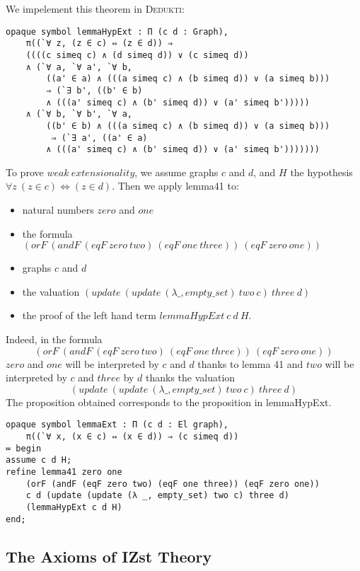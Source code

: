 \documentclass[submission,copyright,creativecommons]{eptcs}
\def\fa{{\forall}}
\newcommand{\dedukti}{\textsc{Dedukti}}
\begin{document}
We impelement this theorem in \dedukti:

\begin{lstlisting}
opaque symbol lemmaHypExt : Π (c d : Graph), 
	π((`∀ z, (z ∈ c) ⇔ (z ∈ d)) ⇒ 
	((((c simeq c) ∧ (d simeq d)) ∨ (c simeq d))
	∧ (`∀ a, `∀ a', `∀ b, 
		((a' ∈ a) ∧ (((a simeq c) ∧ (b simeq d)) ∨ (a simeq b))) 
		⇒ (`∃ b', ((b' ∈ b) 
		∧ (((a' simeq c) ∧ (b' simeq d)) ∨ (a' simeq b')))))
	∧ (`∀ b, `∀ b', `∀ a, 
		((b' ∈ b) ∧ (((a simeq c) ∧ (b simeq d)) ∨ (a simeq b)))
		 ⇒ (`∃ a', ((a' ∈ a) 
	 	∧ (((a' simeq c) ∧ (b' simeq d)) ∨ (a' simeq b')))))))
\end{lstlisting}

To prove $weak \ extensionality$, we assume graphs $c$ and $d$, and $H$ the hypothesis $\fa z~ (z \in c) \Leftrightarrow (z \in d)$. Then we apply lemma41 to:

\begin{itemize}
\item natural numbers $zero$ and $one$
\item the formula $(orF~(andF~(eqF~zero~two)~(eqF~one~three))~(eqF~zero~one))$
\item graphs $c$ and $d$
\item the valuation $(update~(update~(\lambda \_, empty\_set)~two~c)~three~d)$ 
\item the proof of the left hand term $lemmaHypExt~c~d~H$.
\end{itemize}

Indeed, in the formula $$(orF~(andF~(eqF~zero~two)~(eqF~one~three))~(eqF~zero~one))$$ $zero$ and $one$ will be interpreted by $c$ and $d$ thanks to lemma 41 and $two$ will be interpreted by $c$ and $three$ by $d$ thanks the valuation $$(update~(update~(\lambda \_, empty\_set)~two~c)~three~d)$$ The proposition obtained corresponds to the proposition in lemmaHypExt.


\begin{lstlisting}
opaque symbol lemmaExt : Π (c d : El graph), 
	π((`∀ x, (x ∈ c) ⇔ (x ∈ d)) ⇒ (c simeq d))
≔ begin
assume c d H;
refine lemma41 zero one 
	(orF (andF (eqF zero two) (eqF one three)) (eqF zero one)) 
	c d (update (update (λ _, empty_set) two c) three d) 
	(lemmaHypExt c d H)
end;
\end{lstlisting}

\subsection{The Axioms of IZst Theory}
\end{document}

